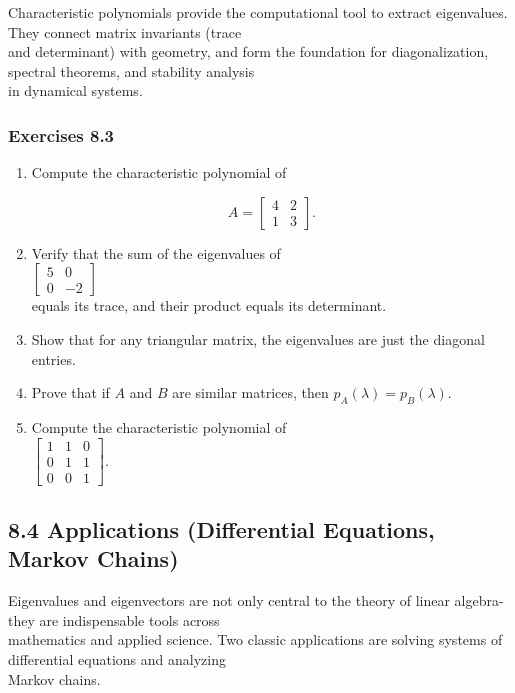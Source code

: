 \documentclass[
  12pt,
  a4paper,
]{article}
\begin{document}
Characteristic polynomials provide the computational tool to extract
eigenvalues. They connect matrix invariants (trace\\
and determinant) with geometry, and form the foundation for
diagonalization, spectral theorems, and stability analysis\\
in dynamical systems.

\subsubsection{Exercises 8.3}\label{exercises-83}

\begin{enumerate}
\def\labelenumi{\arabic{enumi}.}
\item
  Compute the characteristic polynomial of

  \[A = \begin{bmatrix} 4 & 2 \\ 1 & 3 \end{bmatrix}.\]
\item
  Verify that the sum of the eigenvalues of\\
  \(\begin{bmatrix} 5 & 0 \\ 0 & -2 \end{bmatrix}\)\\
  equals its trace, and their product equals its determinant.
\item
  Show that for any triangular matrix, the eigenvalues are just the
  diagonal entries.
\item
  Prove that if \(A\) and \(B\) are similar matrices, then
  \(p_A(\lambda) = p_B(\lambda)\).
\item
  Compute the characteristic polynomial of\\
  \(\begin{bmatrix} 1 & 1 & 0 \\ 0 & 1 & 1 \\ 0 & 0 & 1 \end{bmatrix}\).
\end{enumerate}

\subsection{8.4 Applications (Differential Equations, Markov
Chains)}\label{84-applications-differential-equations-markov-chains}

Eigenvalues and eigenvectors are not only central to the theory of
linear algebra-they are indispensable tools across\\
mathematics and applied science. Two classic applications are solving
systems of differential equations and analyzing\\
Markov chains.
\end{document}
